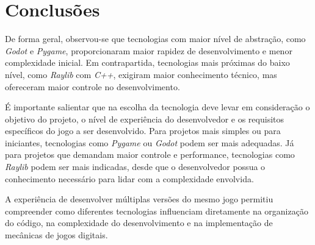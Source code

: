 \chapter{Conclusões}
\label{cap:05}

De forma geral, observou-se que tecnologias com maior nível de abstração, como \textit{Godot} e \textit{Pygame}, proporcionaram maior rapidez de desenvolvimento e menor complexidade inicial. Em contrapartida, tecnologias mais próximas do baixo nível, como \textit{Raylib} com \textit{C++}, exigiram maior conhecimento técnico, mas ofereceram maior controle no desenvolvimento.

É importante salientar que na escolha da tecnologia deve levar em consideração o objetivo do projeto, o nível de experiência do desenvolvedor e os requisitos específicos do jogo a ser desenvolvido. 
Para projetos mais simples ou para iniciantes, tecnologias como \textit{Pygame} ou \textit{Godot} podem ser mais adequadas. Já para projetos que demandam maior controle e performance, tecnologias como \textit{Raylib} podem ser mais indicadas, desde que o desenvolvedor possua o conhecimento necessário para lidar com a complexidade envolvida.

A experiência de desenvolver múltiplas versões do mesmo jogo permitiu compreender como diferentes tecnologias influenciam diretamente na organização do código, na complexidade do desenvolvimento e na implementação de mecânicas de jogos digitais.
